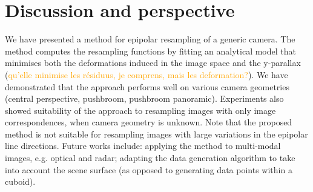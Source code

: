 \documentclass{ipol}
\newcommand{\er}[1]{\textcolor{orange}{#1}}
\begin{document}
\section{Discussion and perspective}
%
We have presented a method for epipolar resampling of a generic camera. The method computes the resampling functions by fitting an analytical model that minimises both the deformations induced in the image space and the y-parallax (\er{qu'elle minimise les résiduus, je comprens, mais les deformation?}). We have demonstrated that the approach performs well on various camera geometries (central perspective, pushbroom, pushbroom panoramic). Experiments also showed suitability of the approach to resampling images with only image correspondences, when camera geometry is unknown. Note that the proposed method is not suitable for resampling images with large variations in the epipolar line directions. Future works include: applying the method to multi-modal images, e.g. optical and radar; adapting the data generation algorithm to take into account the scene surface (as opposed to generating data points within a cuboid).
%
%
%
\end{document}
